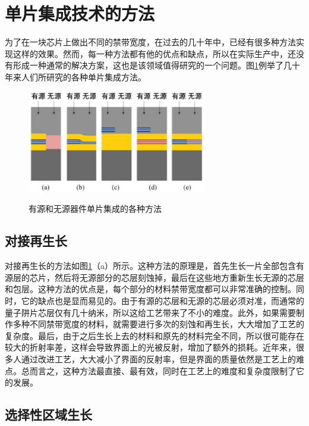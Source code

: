 \documentclass{ZJUthesis}
\begin{document}
\section{单片集成技术的方法}

为了在一块芯片上做出不同的禁带宽度，在过去的几十年中，已经有很多种方法实现这样的效果。然而，每一种方法都有他的优点和缺点，所以在实际生产中，还没有形成一种通常的解决方案，这也是该领域值得研究的一个问题。图\ref{fig_pic_methods}例举了几十年来人们所研究的各种单片集成方法。

\begin{figure}[!ht]
  \centering
  \includegraphics[width=0.7\textwidth]{./Pictures/pic_methods.eps}\\
  \caption{有源和无源器件单片集成的各种方法}
  \label{fig_pic_methods}
\end{figure}

\subsection{对接再生长}

对接再生长的方法如图\ref{fig_pic_methods}（a）所示。这种方法的原理是，首先生长一片全部包含有源层的芯片，然后将无源部分的芯层刻蚀掉，最后在这些地方重新生长无源的芯层和包层。这种方法的优点是，每个部分的材料禁带宽度都可以非常准确的控制。同时，它的缺点也是显而易见的。由于有源的芯层和无源的芯层必须对准，而通常的量子阱片芯层仅有几十纳米，所以这给工艺带来了不小的难度。此外，如果需要制作多种不同禁带宽度的材料，就需要进行多次的刻蚀和再生长，大大增加了工艺的复杂度。最后，由于之后生长上去的材料和原先的材料完全不同，所以很可能存在较大的折射率差，这样会导致界面上的光被反射，增加了额外的损耗。近年来，很多人通过改进工艺，大大减小了界面的反射率，但是界面的质量依然是工艺上的难点。总而言之，这种方法最直接、最有效，同时在工艺上的难度和复杂度限制了它的发展。

\subsection{选择性区域生长}
\end{document}
